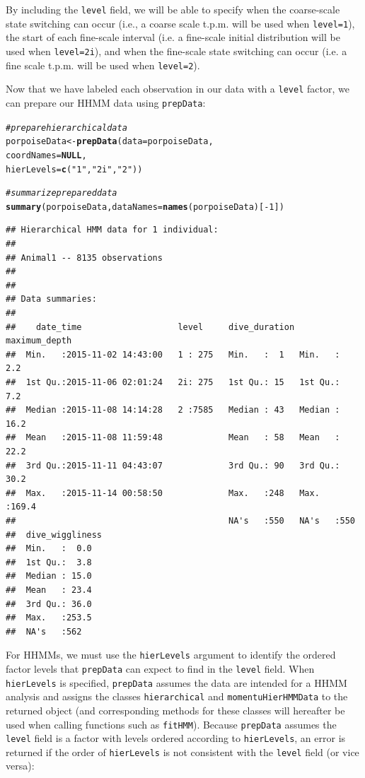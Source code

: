 \documentclass[12pt]{article}\usepackage[]{graphicx}\usepackage[]{color}
\makeatletter
\newcommand{\hlnum}[1]{\textcolor[rgb]{0.686,0.059,0.569}{#1}}%
\newcommand{\hlstr}[1]{\textcolor[rgb]{0.192,0.494,0.8}{#1}}%
\newcommand{\hlcom}[1]{\textcolor[rgb]{0.678,0.584,0.686}{\textit{#1}}}%
\newcommand{\hlopt}[1]{\textcolor[rgb]{0,0,0}{#1}}%
\newcommand{\hlstd}[1]{\textcolor[rgb]{0.345,0.345,0.345}{#1}}%
\newcommand{\hlkwa}[1]{\textcolor[rgb]{0.161,0.373,0.58}{\textbf{#1}}}%
\newcommand{\hlkwb}[1]{\textcolor[rgb]{0.69,0.353,0.396}{#1}}%
\newcommand{\hlkwc}[1]{\textcolor[rgb]{0.333,0.667,0.333}{#1}}%
\newcommand{\hlkwd}[1]{\textcolor[rgb]{0.737,0.353,0.396}{\textbf{#1}}}%
\newenvironment{kframe}{%
 \def\at@end@of@kframe{}%
 \ifinner\ifhmode%
  \def\at@end@of@kframe{\end{minipage}}%
  \begin{minipage}{\columnwidth}%
 \fi\fi%
 \def\FrameCommand##1{\hskip\@totalleftmargin \hskip-\fboxsep
 \colorbox{shadecolor}{##1}\hskip-\fboxsep
     \hskip-\linewidth \hskip-\@totalleftmargin \hskip\columnwidth}%
 \MakeFramed {\advance\hsize-\width
   \@totalleftmargin\z@ \linewidth\hsize
   \@setminipage}}%
 {\par\unskip\endMakeFramed%
 \at@end@of@kframe}
\newenvironment{knitrout}{}{} %
\makeatother
\begin{document}
\noindent By including the \verb|level| field, we will be able to specify when the coarse-scale state switching can occur (i.e., a coarse scale t.p.m. will be used when \verb|level=1|), the start of each fine-scale interval (i.e. a fine-scale initial distribution will be used when \verb|level=2i|), and when the fine-scale state switching can occur (i.e. a fine scale t.p.m. will be used when \verb|level=2|).

Now that we have labeled each observation in our data with a \verb|level| factor, we can prepare our HHMM data using \verb|prepData|:
\begin{knitrout}
\color{fgcolor}\begin{kframe}
\begin{alltt}
\hlcom{# prepare hierarchical data}
\hlstd{porpoiseData} \hlkwb{<-} \hlkwd{prepData}\hlstd{(}\hlkwc{data} \hlstd{= porpoiseData,}
                         \hlkwc{coordNames} \hlstd{=} \hlkwa{NULL}\hlstd{,}
                         \hlkwc{hierLevels} \hlstd{=} \hlkwd{c}\hlstd{(}\hlstr{"1"}\hlstd{,} \hlstr{"2i"}\hlstd{,} \hlstr{"2"}\hlstd{))}

\hlcom{# summarize prepared data}
\hlkwd{summary}\hlstd{(porpoiseData,} \hlkwc{dataNames} \hlstd{=} \hlkwd{names}\hlstd{(porpoiseData)[}\hlopt{-}\hlnum{1}\hlstd{])}
\end{alltt}
\begin{verbatim}
## Hierarchical HMM data for 1 individual:
## 
## Animal1 -- 8135 observations
## 
## 
## Data summaries:
## 
##    date_time                   level     dive_duration maximum_depth  
##  Min.   :2015-11-02 14:43:00   1 : 275   Min.   :  1   Min.   :  2.2  
##  1st Qu.:2015-11-06 02:01:24   2i: 275   1st Qu.: 15   1st Qu.:  7.2  
##  Median :2015-11-08 14:14:28   2 :7585   Median : 43   Median : 16.2  
##  Mean   :2015-11-08 11:59:48             Mean   : 58   Mean   : 22.2  
##  3rd Qu.:2015-11-11 04:43:07             3rd Qu.: 90   3rd Qu.: 30.2  
##  Max.   :2015-11-14 00:58:50             Max.   :248   Max.   :169.4  
##                                          NA's   :550   NA's   :550    
##  dive_wiggliness
##  Min.   :  0.0  
##  1st Qu.:  3.8  
##  Median : 15.0  
##  Mean   : 23.4  
##  3rd Qu.: 36.0  
##  Max.   :253.5  
##  NA's   :562
\end{verbatim}
\end{kframe}
\end{knitrout}
\noindent For HHMMs, we must use the \verb|hierLevels| argument to identify the ordered factor levels that \verb|prepData| can expect to find in the \verb|level| field. When \verb|hierLevels| is specified, \verb|prepData| assumes the data are intended for a HHMM analysis and assigns the classes \verb|hierarchical| and \verb|momentuHierHMMData| to the returned object (and corresponding methods for these classes will hereafter be used when calling functions such as \verb|fitHMM|). Because \verb|prepData| assumes the \verb|level| field is a factor with levels ordered according to \verb|hierLevels|, an error is returned if the order of \verb|hierLevels| is not consistent with the \verb|level| field (or vice versa): 
\end{document}
